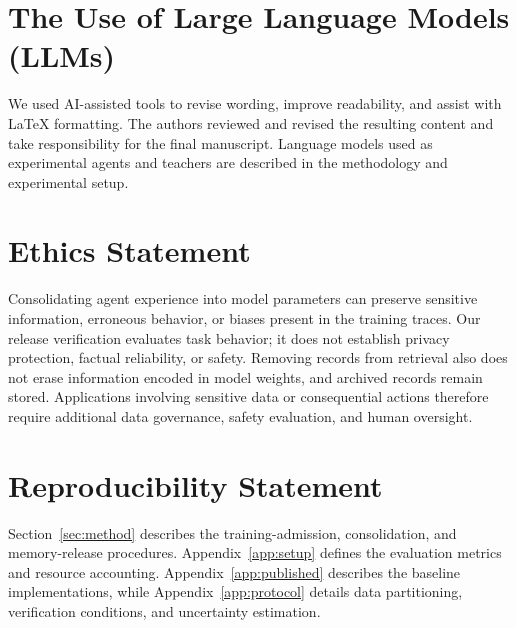 \section*{The Use of Large Language Models (LLMs)}
We used AI-assisted tools to revise wording, improve
readability, and assist with LaTeX formatting. The authors
reviewed and revised the resulting content and take
responsibility for the final manuscript. Language models
used as experimental agents and teachers are described
in the methodology and experimental setup.

\section*{Ethics Statement}
Consolidating agent experience into model parameters can
preserve sensitive information, erroneous behavior, or
biases present in the training traces. Our release
verification evaluates task behavior; it does not establish
privacy protection, factual reliability, or safety.
Removing records from retrieval also does not erase
information encoded in model weights, and archived records
remain stored. Applications involving sensitive data or
consequential actions therefore require additional data
governance, safety evaluation, and human oversight.

\section*{Reproducibility Statement}
Section~\ref{sec:method} describes the training-admission,
consolidation, and memory-release procedures.
Appendix~\ref{app:setup} defines the evaluation metrics
and resource accounting.
Appendix~\ref{app:published} describes the baseline
implementations, while Appendix~\ref{app:protocol}
details data partitioning, verification conditions,
and uncertainty estimation.